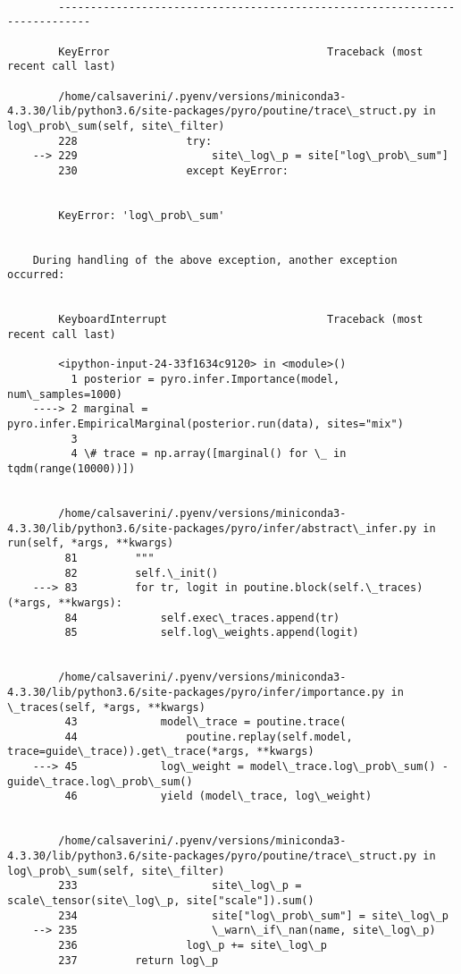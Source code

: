 \documentclass[11pt]{article}
\begin{document}
    \begin{Verbatim}[commandchars=\\\{\}]

        ---------------------------------------------------------------------------

        KeyError                                  Traceback (most recent call last)

        /home/calsaverini/.pyenv/versions/miniconda3-4.3.30/lib/python3.6/site-packages/pyro/poutine/trace\_struct.py in log\_prob\_sum(self, site\_filter)
        228                 try:
    --> 229                     site\_log\_p = site["log\_prob\_sum"]
        230                 except KeyError:


        KeyError: 'log\_prob\_sum'

        
    During handling of the above exception, another exception occurred:


        KeyboardInterrupt                         Traceback (most recent call last)

        <ipython-input-24-33f1634c9120> in <module>()
          1 posterior = pyro.infer.Importance(model, num\_samples=1000)
    ----> 2 marginal = pyro.infer.EmpiricalMarginal(posterior.run(data), sites="mix")
          3 
          4 \# trace = np.array([marginal() for \_ in tqdm(range(10000))])


        /home/calsaverini/.pyenv/versions/miniconda3-4.3.30/lib/python3.6/site-packages/pyro/infer/abstract\_infer.py in run(self, *args, **kwargs)
         81         """
         82         self.\_init()
    ---> 83         for tr, logit in poutine.block(self.\_traces)(*args, **kwargs):
         84             self.exec\_traces.append(tr)
         85             self.log\_weights.append(logit)


        /home/calsaverini/.pyenv/versions/miniconda3-4.3.30/lib/python3.6/site-packages/pyro/infer/importance.py in \_traces(self, *args, **kwargs)
         43             model\_trace = poutine.trace(
         44                 poutine.replay(self.model, trace=guide\_trace)).get\_trace(*args, **kwargs)
    ---> 45             log\_weight = model\_trace.log\_prob\_sum() - guide\_trace.log\_prob\_sum()
         46             yield (model\_trace, log\_weight)


        /home/calsaverini/.pyenv/versions/miniconda3-4.3.30/lib/python3.6/site-packages/pyro/poutine/trace\_struct.py in log\_prob\_sum(self, site\_filter)
        233                     site\_log\_p = scale\_tensor(site\_log\_p, site["scale"]).sum()
        234                     site["log\_prob\_sum"] = site\_log\_p
    --> 235                     \_warn\_if\_nan(name, site\_log\_p)
        236                 log\_p += site\_log\_p
        237         return log\_p



\end{Verbatim}
\end{document}
